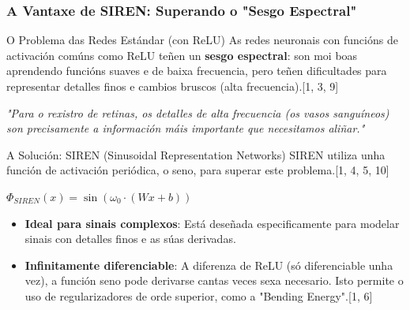 \documentclass[xcolor=dvipsnames]{beamer}
\begin{document}
\begin{frame}
    \frametitle{A Vantaxe de SIREN: Superando o "Sesgo Espectral"}
    
    \begin{block}{O Problema das Redes Estándar (con ReLU)}
        As redes neuronais con funcións de activación comúns como ReLU teñen un \textbf{sesgo espectral}: son moi boas aprendendo funcións suaves e de baixa frecuencia, pero teñen dificultades para representar detalles finos e cambios bruscos (alta frecuencia).[1, 3, 9]
        
        \vspace{0.3cm}
        \textit{"Para o rexistro de retinas, os detalles de alta frecuencia (os vasos sanguíneos) son precisamente a información máis importante que necesitamos aliñar."}
    \end{block}
    
    \begin{alertblock}{A Solución: SIREN (Sinusoidal Representation Networks)}
        SIREN utiliza unha función de activación periódica, o seno, para superar este problema.[1, 4, 5, 10]
        
        \vspace{0.3cm}
        \centering
        $\Phi_{SIREN}(x) = \sin(\omega_0 \cdot (Wx + b))$
        \vspace{0.3cm}
        
        \begin{itemize}
            \item \textbf{Ideal para sinais complexos}: Está deseñada especificamente para modelar sinais con detalles finos e as súas derivadas.
            \item \textbf{Infinitamente diferenciable}: A diferenza de ReLU (só diferenciable unha vez), a función seno pode derivarse cantas veces sexa necesario. Isto permite o uso de regularizadores de orde superior, como a "Bending Energy".[1, 6]
        \end{itemize}
    \end{alertblock}
    

\end{frame}
\end{document}
